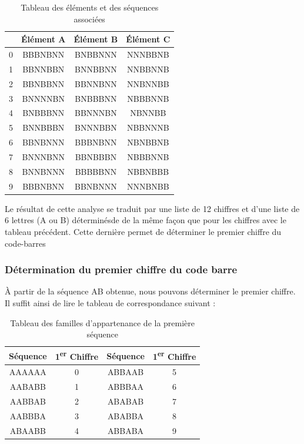 \documentclass{rapport}
\begin{document}
\begin{table}[h!]
    \centering
    \renewcommand{\arraystretch}{1.5} %
    \begin{tabular}{|c|c|c|c|}
        \hline
        & \textbf{Élément A} & \textbf{Élément B} & \textbf{Élément C} \\ \hline
        0 & BBBNBNN & BNBBNNN & NNNBBNB \\ \hline
        1 & BBNNBBN & BNNBBNN & NNBBNNB \\ \hline
        2 & BBNBBNN & BBNNBNN & NNBNNBB \\ \hline
        3 & BNNNNBN & BNBBBNN & NBBBNNB \\ \hline
        4 & BNBBBNN & BBNNNBN & NBNNBB \\ \hline
        5 & BNNBBBN & BNNNBBN & NBBNNNB \\ \hline
        6 & BBNBNNN & BBBNBNN & NBNBBNB \\ \hline
        7 & BNNNBNN & BBNBBBN & NBBBNNB \\ \hline
        8 & BNNBNNN & BBBBBNN & NBBNBBB \\ \hline
        9 & BBBNBNN & BBNBNNN & NNNBNBB \\ \hline
    \end{tabular}
    \caption{Tableau des éléments et des séquences associées}
    \label{tab:elements}
\end{table}

Le résultat de cette analyse se traduit par une liste de 12 chiffres et d'une liste de 6 lettres (A ou B) déterminésde
de la même façon que pour les chiffres avec le tableau précédent. Cette dernière permet de déterminer le premier chiffre du code-barres

\subsubsection*{Détermination du premier chiffre du code barre}

À partir de la séquence AB obtenue, nous pouvons déterminer le premier chiffre. 
Il suffit ainsi de lire le tableau de correspondance suivant :

\begin{table}[h!]
    \centering
    \renewcommand{\arraystretch}{1.5} %
    \begin{tabular}{|c|c|c|c|}
        \hline
        \textbf{Séquence} & \textbf{1\textsuperscript{er} Chiffre} & \textbf{Séquence} & \textbf{1\textsuperscript{er} Chiffre} \\ \hline
        AAAAAA & 0 & ABBAAB & 5 \\ \hline
        AABABB & 1 & ABBBAA & 6 \\ \hline
        AABBAB & 2 & ABABAB & 7 \\ \hline
        AABBBA & 3 & ABABBA & 8 \\ \hline
        ABAABB & 4 & ABBABA & 9 \\ \hline
    \end{tabular}
    \caption{Tableau des familles d’appartenance de la première séquence}
    \label{tab:sequence}
\end{table}
\end{document}
